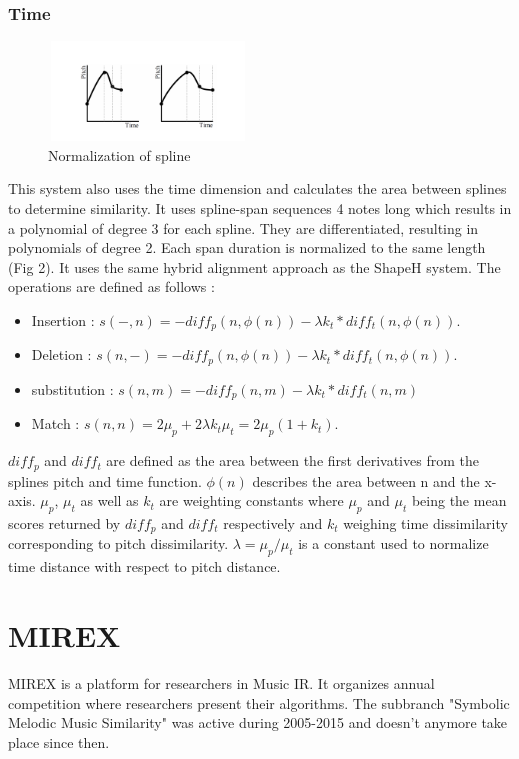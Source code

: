 \documentclass{llncs}
\begin{document}
\begin{itemize}
		\subsubsection{Time}
        \begin{figure}[h!]
			\centering
		  \includegraphics[width=200px,height=100px,keepaspectratio]{two_of_five_point_one}
			\caption{Normalization of spline \cite{five_point_two}}
        \end{figure}
        This system also uses the time dimension and calculates the area between splines to determine similarity. It uses spline-span sequences 4 notes long which results in a polynomial of degree 3 for each spline. They are differentiated, resulting in polynomials of degree 2. Each span duration is normalized to the same length (Fig 2). It uses the same hybrid alignment approach as the ShapeH system. 
		The operations are defined as follows : 
        \begin{itemize}
         \item Insertion : 
        $ s(-,n) = -diff _p(n, \phi(n)) - \lambda k_t * diff_t(n, \phi(n)).$
        \item Deletion : 
         $s(n,-) = -diff_p(n, \phi(n)) - \lambda k_t * diff_t (n, \phi(n)).$
       \item substitution : 
       $s(n,m) = - diff_p (n,m) - \lambda k_t * diff_t (n,m) $
       \item Match : 
        $s(n,n) = 2\mu_p + 2\lambda k_t \mu_t = 2\mu_p (1+k_t).$
        \end{itemize}
        
        $diff_p$ and $diff_t$ are defined as the area between the first derivatives from the splines pitch and time function. $ \phi(n)$ describes the area between n and the x-axis. $\mu_p$, $\mu_t$ as well as $k_t$ are weighting constants where $\mu_p$ and $\mu_t$ being the mean scores returned by $diff_p$ and $diff_t$ respectively and $k_t$ weighing time dissimilarity corresponding to pitch dissimilarity. $ \lambda = \mu_p / \mu_t$ is a constant used to normalize time distance with respect to pitch distance.
        
	\section{MIREX}
		MIREX is a platform for researchers in Music IR. It organizes annual competition where researchers present their algorithms. The subbranch "Symbolic Melodic Music Similarity" was active during 2005-2015 and doesn't anymore take place since then. 


\end{itemize}
\end{document}
